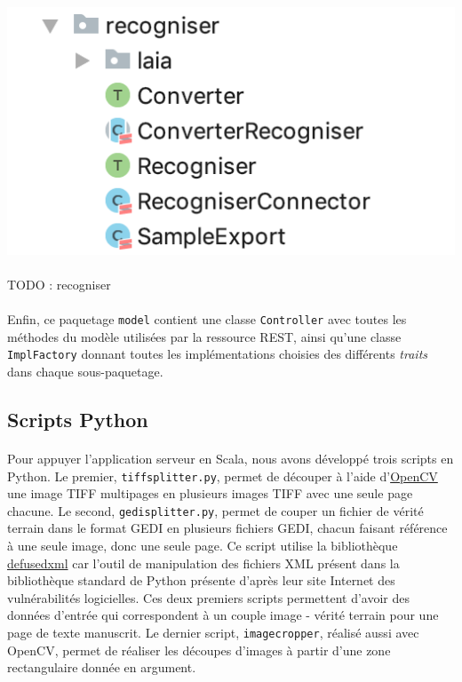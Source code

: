 \begin{mdframed}[frametitle={Figure 1 : Paquetage \texttt{recogniser}}, innerbottommargin=10]
\begin{center}
\includegraphics[scale=0.7]{assets/recogniser.png}
\end{center}
\end{mdframed}

\paragraph{}
TODO : recogniser

\paragraph{}
Enfin, ce paquetage \texttt{model} contient une classe \texttt{Controller} avec toutes les méthodes du modèle utilisées par la ressource REST, ainsi qu'une classe \texttt{ImplFactory} donnant toutes les implémentations choisies des différents \textit{traits} dans chaque sous-paquetage.

\subsection{Scripts Python}

\paragraph{}
Pour appuyer l'application serveur en Scala, nous avons développé trois scripts en Python. Le premier, \texttt{tiffsplitter.py}, permet de découper à l'aide d'\href{https://opencv.org/}{OpenCV} une image TIFF multipages en plusieurs images TIFF avec une seule page chacune. Le second, \texttt{gedisplitter.py}, permet de couper un fichier de vérité terrain dans le format GEDI en plusieurs fichiers GEDI, chacun faisant référence à une seule image, donc une seule page. Ce script utilise la bibliothèque \href{https://pypi.org/project/defusedxml/}{defusedxml} car l'outil de manipulation des fichiers XML présent dans la bibliothèque standard de Python présente d'après leur site Internet des vulnérabilités logicielles. Ces deux premiers scripts permettent d'avoir des données d'entrée qui correspondent à un couple image - vérité terrain pour une page de texte manuscrit. Le dernier script, \texttt{imagecropper}, réalisé aussi avec OpenCV, permet de réaliser les découpes d'images à partir d'une zone rectangulaire donnée en argument.

